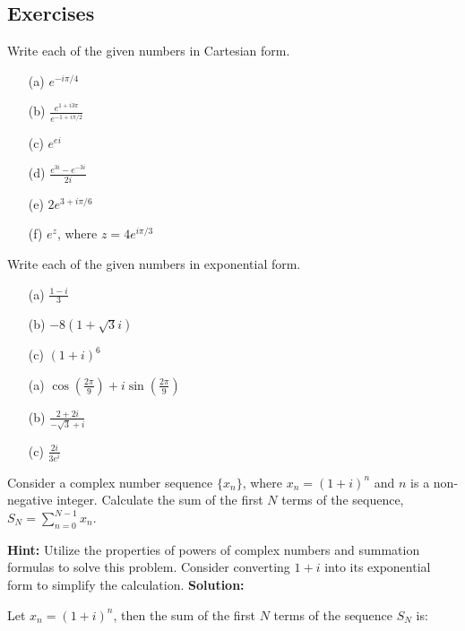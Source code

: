 \subsection{Exercises}
\begin{exercise}
    Write each of the given numbers in Cartesian form.
\begin{enumerate}
    \item[(a)] \( e^{-i\pi/4} \)
    \item[(b)] \( \frac{e^{1+i3\pi}}{e^{-1+i\pi/2}} \)
    \item[(c)] \( e^{ei} \)

    \item[(d)] \( \frac{e^{3i} - e^{-3i}}{2i} \)
    \item[(e)] \( 2e^{3+i\pi/6} \)
    \item[(f)] \( e^{z} \), where \( z = 4e^{i\pi/3} \)
\end{enumerate}
\end{exercise}
\begin{exercise}
    Write each of the given numbers in exponential form.
    \begin{enumerate}
        \item[(a)] \( \frac{1 - i}{3} \)
        \item[(b)] \( -8\left(1 + \sqrt{3}i\right) \)
        \item[(c)] \( (1 + i)^6 \)
        \item[(a)] \( \cos\left(\frac{2\pi}{9}\right) + i \sin\left(\frac{2\pi}{9}\right) \)
        \item[(b)] \( \frac{2 + 2i}{-\sqrt{3} + i} \)
        \item[(c)] \( \frac{2i}{3e^{i}} \)
    \end{enumerate}
\end{exercise}

\begin{exercise}
    Consider a complex number sequence \(\{x_n\}\), where \(x_n = (1 + i)^n\) and \(n\) is a non-negative integer. Calculate the sum of the first \(N\) terms of the sequence, \(S_N = \sum_{n=0}^{N-1} x_n\).

\end{exercise}
\textbf{Hint:}
Utilize the properties of powers of complex numbers and summation formulas to solve this problem. Consider converting \(1 + i\) into its exponential form to simplify the calculation.
\textbf{Solution:}

    Let \( x_n = (1 + i)^n \), then the sum of the first \( N \) terms of the sequence \( S_N \) is:

